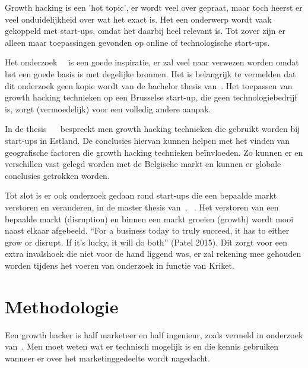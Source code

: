 Growth hacking is een 'hot topic', er wordt veel over gepraat, maar toch heerst er veel onduidelijkheid over wat het exact is. Het een onderwerp wordt vaak gekoppeld met start-ups, omdat het daarbij heel relevant is. Tot zover zijn er alleen maar toepassingen gevonden op online of technologische start-ups.

Het onderzoek~~\autocite{Lee2016} is een goede inspiratie, er zal veel naar verwezen worden omdat het een goede basis is met degelijke bronnen. Het is belangrijk te vermelden dat dit onderzoek geen kopie wordt van de bachelor thesis van~\textcite{Lee2016}. Het toepassen van growth hacking technieken op een Brusselse start-up, die geen technologiebedrijf is, zorgt (vermoedelijk) voor een volledig andere aanpak. 

In de thesis ~~\autocite{Vunk2017} bespreekt men growth hacking technieken die gebruikt worden bij start-ups in Estland. De conclusies hiervan kunnen helpen met het vinden van geografische factoren die growth hacking technieken beïnvloeden. Zo kunnen er en verschillen vast gelegd worden met de Belgische markt en kunnen er globale conclusies getrokken worden.

Tot slot is er ook onderzoek gedaan rond start-ups die een bepaalde markt verstoren en veranderen, in de master thesis van~\textcite{Bergendal2017}, ~. Het verstoren van een bepaalde markt (disruption) en binnen een markt groeien (growth) wordt mooi naast elkaar afgebeeld. “For a business today to truly succeed, it has to either grow or disrupt. If it’s lucky, it will do both” (Patel 2015). Dit zorgt voor een extra invalshoek die niet voor de hand liggend was, er zal rekening mee gehouden worden tijdens het voeren van onderzoek in functie van Kriket. 


\section{Methodologie}
\label{sec:methodologie}

Een growth hacker is half marketeer en half ingenieur, zoals vermeld in onderzoek van~\textcite{Lee2016}. Men moet weten wat er technisch mogelijk is en die kennis gebruiken wanneer er over het marketinggedeelte wordt nagedacht. 

